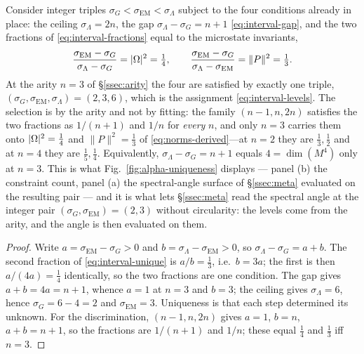 \begin{proposition}\label{prop:interval-uniqueness}
Consider integer triples $\sigma_G<\sigma_{\mathrm{EM}}<\sigma_\Lambda$ subject to the four
conditions already in place: the ceiling $\sigma_\Lambda=2n$, the gap
$\sigma_\Lambda-\sigma_G=n+1$ \eqref{eq:interval-gap}, and the two fractions of
\eqref{eq:interval-fractions} equal to the microstate invariants,
\begin{equation}\label{eq:interval-unique}
  \frac{\sigma_{\mathrm{EM}}-\sigma_G}{\sigma_\Lambda-\sigma_G}=|\Omega|^{2}=\tfrac14,
  \qquad
  \frac{\sigma_{\mathrm{EM}}-\sigma_G}{\sigma_\Lambda-\sigma_{\mathrm{EM}}}=\|P\|^{2}=\tfrac13 .
\end{equation}
At the arity $n=3$ of \S\ref{ssec:arity} the four are satisfied by exactly one triple,
$(\sigma_G,\sigma_{\mathrm{EM}},\sigma_\Lambda)=(2,3,6)$, which is the assignment
\eqref{eq:interval-levels}. The selection is by the arity and not by fitting: the family
$(n-1,n,2n)$ satisfies the two fractions as $1/(n+1)$ and $1/n$ for \emph{every} $n$, and only
$n=3$ carries them onto $|\Omega|^{2}=\tfrac14$ and $\|P\|^{2}=\tfrac13$ of
\eqref{eq:norms-derived}---at $n=2$ they are $\tfrac13,\tfrac12$ and at $n=4$ they are
$\tfrac15,\tfrac14$. Equivalently, $\sigma_\Lambda-\sigma_G=n+1$ equals $4=\dim(M^{4})$ only at
$n=3$. This is what Fig.~\ref{fig:alpha-uniqueness} displays --- panel (b) the constraint count,
panel (a) the spectral-angle surface of \S\ref{ssec:meta} evaluated on the resulting pair --- and it
is what lets
\S\ref{ssec:meta} read the spectral angle at the integer pair
$(\sigma_G,\sigma_{\mathrm{EM}})=(2,3)$ without circularity: the levels come from the arity, and
the angle is then evaluated on them.


\end{proposition}
\begin{proof}
Write $a=\sigma_{\mathrm{EM}}-\sigma_G>0$ and $b=\sigma_\Lambda-\sigma_{\mathrm{EM}}>0$, so
$\sigma_\Lambda-\sigma_G=a+b$. The second fraction of \eqref{eq:interval-unique} is $a/b=\tfrac13$,
i.e.\ $b=3a$; the first is then $a/(4a)=\tfrac14$ identically, so the two fractions are one
condition. The gap gives $a+b=4a=n+1$, whence $a=1$ at $n=3$ and $b=3$; the ceiling gives
$\sigma_\Lambda=6$, hence $\sigma_G=6-4=2$ and $\sigma_{\mathrm{EM}}=3$. Uniqueness is that each
step determined its unknown. For the discrimination, $(n-1,n,2n)$ gives $a=1$, $b=n$, $a+b=n+1$, so
the fractions are $1/(n+1)$ and $1/n$; these equal $\tfrac14$ and $\tfrac13$ iff $n=3$.
\end{proof}

